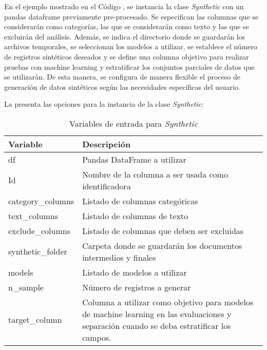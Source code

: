 En el ejemplo mostrado en el Código , se instancia la clase \emph{Synthetic} con un pandas dataframe previamente pre-procesado. Se especifican las columnas que se considerarán como categorías, las que se considerarán como texto y las que se excluirán del análisis. Además, se indica el directorio donde se guardarán los archivos temporales, se seleccionan los modelos a utilizar, se establece el número de registros sintéticos deseados y se define una columna objetivo para realizar pruebas con machine learning y estratificar los conjuntos parciales de datos que se utilizarán. De esta manera, se configura de manera flexible el proceso de generación de datos sintéticos según las necesidades específicas del usuario.

La  presenta las opciones para la instancia de la clase \emph{Synthetic}:

\begin{table}[H]
\centering
\caption{Variables de entrada para \emph{Synthetic}}
\label{synthetic-input}
\begin{tabular}{|l|m{25em}|}
\hline
\rowcolor[gray]{0.8}
\textbf{Variable} & \textbf{Descripción} \\
\hline
df & Pandas DataFrame a utilizar \\
\hline
Id & Nombre de la columna a ser usada como identificadora \\
\hline
category\_columns & Listado de columnas categóricas \\
\hline
text\_columns & Listado de columnas de texto \\
\hline
exclude\_columns & Listado de columnas que deben ser excluidas \\
\hline
synthetic\_folder & Carpeta donde se guardarán los documentos intermedios y finales \\
\hline
models & Listado de modelos a utilizar \\
\hline
n\_sample & Número de registros a generar \\
\hline
target\_column & Columna a utilizar como objetivo para modelos de machine learning en las evaluaciones y separación cuando se deba estratificar los campos. \\
\hline
\end{tabular}
\end{table}

